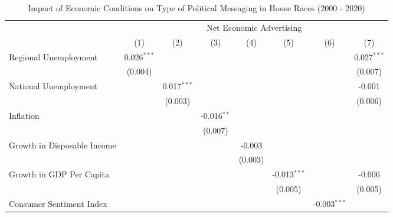 
\begin{table}[htbp]
   \caption{Impact of Economic Conditions on Type of Political Messaging in House Races (2000 - 2020)}
   \bigskip
   \centering
   \small
   \begin{tabular}{lccccccc}
      \toprule
       & \multicolumn{7}{c}{Net Economic Advertising}\\
                                  & (1)           & (2)           & (3)           & (4)           & (5)            & (6)            & (7)\\  
      \midrule 
      Regional Unemployment       & 0.026$^{***}$ &               &               &               &                &                & 0.027$^{***}$\\   
                                  & (0.004)       &               &               &               &                &                & (0.007)\\   
      National Unemployment       &               & 0.017$^{***}$ &               &               &                &                & -0.001\\   
                                  &               & (0.003)       &               &               &                &                & (0.006)\\   
      Inflation                   &               &               & -0.016$^{**}$ &               &                &                &   \\   
                                  &               &               & (0.007)       &               &                &                &   \\   
      Growth in Disposable Income &               &               &               & -0.003        &                &                &   \\   
                                  &               &               &               & (0.003)       &                &                &   \\   
      Growth in GDP Per Capita    &               &               &               &               & -0.013$^{***}$ &                & -0.006\\   
                                  &               &               &               &               & (0.005)        &                & (0.005)\\   
      Consumer Sentiment Index    &               &               &               &               &                & -0.003$^{***}$ &   \\   

\end{tabular}
\end{table}
